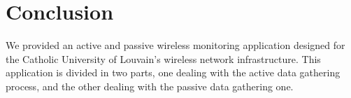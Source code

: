 
\chapter{Conclusion} %

\label{Chapter 7} %


We provided an active and passive wireless monitoring application designed for the Catholic University of Louvain's wireless network infrastructure. This application is divided in two parts, one dealing with the active data gathering process, and the other dealing with the passive data gathering one. 






